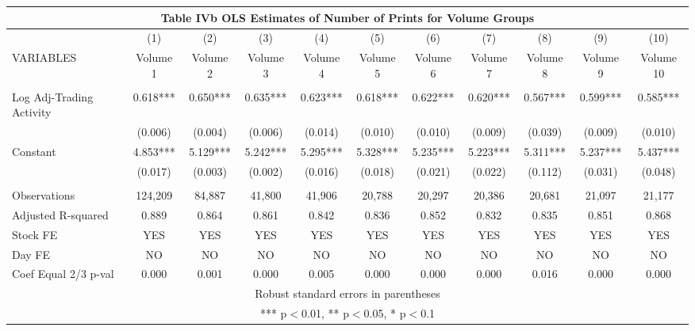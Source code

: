 \documentclass[]{article}
\begin{document}
\begin{tabular}{lcccccccccc}
\multicolumn{11}{c}{Table IVb OLS Estimates of Number of Prints for Volume Groups} \\ \hline
 & (1) & (2) & (3) & (4) & (5) & (6) & (7) & (8) & (9) & (10) \\
VARIABLES & Volume 1 & Volume 2 & Volume 3 & Volume 4 & Volume 5 & Volume 6 & Volume 7 & Volume 8 & Volume 9 & Volume 10 \\ \hline
 &  &  &  &  &  &  &  &  &  &  \\
Log Adj-Trading Activity & 0.618*** & 0.650*** & 0.635*** & 0.623*** & 0.618*** & 0.622*** & 0.620*** & 0.567*** & 0.599*** & 0.585*** \\
 & (0.006) & (0.004) & (0.006) & (0.014) & (0.010) & (0.010) & (0.009) & (0.039) & (0.009) & (0.010) \\
Constant & 4.853*** & 5.129*** & 5.242*** & 5.295*** & 5.328*** & 5.235*** & 5.223*** & 5.311*** & 5.237*** & 5.437*** \\
 & (0.017) & (0.003) & (0.002) & (0.016) & (0.018) & (0.021) & (0.022) & (0.112) & (0.031) & (0.048) \\
 &  &  &  &  &  &  &  &  &  &  \\
Observations & 124,209 & 84,887 & 41,800 & 41,906 & 20,788 & 20,297 & 20,386 & 20,681 & 21,097 & 21,177 \\
Adjusted R-squared & 0.889 & 0.864 & 0.861 & 0.842 & 0.836 & 0.852 & 0.832 & 0.835 & 0.851 & 0.868 \\
Stock FE & YES & YES & YES & YES & YES & YES & YES & YES & YES & YES \\
Day FE & NO & NO & NO & NO & NO & NO & NO & NO & NO & NO \\
 Coef Equal 2/3 p-val & 0.000 & 0.001 & 0.000 & 0.005 & 0.000 & 0.000 & 0.000 & 0.016 & 0.000 & 0.000 \\ \hline
\multicolumn{11}{c}{ Robust standard errors in parentheses} \\
\multicolumn{11}{c}{ *** p$<$0.01, ** p$<$0.05, * p$<$0.1} \\
\end{tabular}
\end{document}
